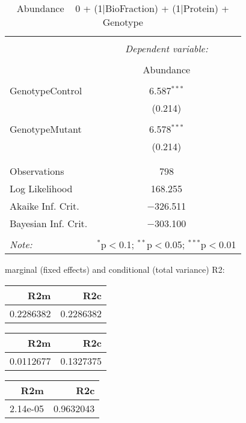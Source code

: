 \documentclass[11pt]{report}
\begin{document}
\begin{table}[!htbp] \centering 
  \caption{Abundance ~ 0 + (1|BioFraction) + (1|Protein) + Genotype} 
  \label{} 
\begin{tabular}{@{\extracolsep{5pt}}lc} 
\\[-1.8ex]\hline 
\hline \\[-1.8ex] 
 & \multicolumn{1}{c}{\textit{Dependent variable:}} \\ 
\cline{2-2} 
\\[-1.8ex] & Abundance \\ 
\hline \\[-1.8ex] 
 GenotypeControl & 6.587$^{***}$ \\ 
  & (0.214) \\ 
  & \\ 
 GenotypeMutant & 6.578$^{***}$ \\ 
  & (0.214) \\ 
  & \\ 
\hline \\[-1.8ex] 
Observations & 798 \\ 
Log Likelihood & 168.255 \\ 
Akaike Inf. Crit. & $-$326.511 \\ 
Bayesian Inf. Crit. & $-$303.100 \\ 
\hline 
\hline \\[-1.8ex] 
\textit{Note:}  & \multicolumn{1}{r}{$^{*}$p$<$0.1; $^{**}$p$<$0.05; $^{***}$p$<$0.01} \\ 
\end{tabular} 
\end{table} 
marginal (fixed effects) and conditional (total variance) R2:

\begin{tabular}{r|r}
\hline
R2m & R2c\\
\hline
0.2286382 & 0.2286382\\
\hline
\end{tabular}

\begin{tabular}{r|r}
\hline
R2m & R2c\\
\hline
0.0112677 & 0.1327375\\
\hline
\end{tabular}

\begin{tabular}{r|r}
\hline
R2m & R2c\\
\hline
2.14e-05 & 0.9632043\\
\hline
\end{tabular}
\end{document}

